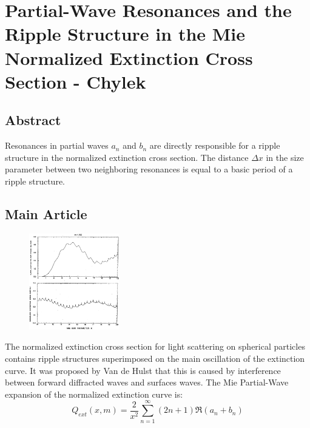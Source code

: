 \documentclass{article}
\theoremstyle{mystyle}
\begin{document}
\section{Partial-Wave Resonances and the Ripple Structure in the Mie Normalized Extinction Cross Section - Chylek}
\subsection{Abstract}
\noindent Resonances in partial waves $a_{n}$ and $b_{n}$ are directly responsible for a ripple structure in the normalized extinction cross section. The distance $\Delta x$ in the size parameter between two neighboring resonances is equal to a basic period of a ripple structure. 
\subsection{Main Article}
\begin{figure}
	\centering
	\includegraphics[width = 0.35\textwidth]{CHYLEK_1}
\end{figure}
\noindent The normalized extinction cross section for light scattering on spherical particles contains ripple structures superimposed on the main oscillation of the extinction curve. It was proposed by Van de Hulst that this is caused by interference between forward diffracted waves and surfaces waves. The Mie Partial-Wave expansion of the normalized extinction curve is:
\begin{equation}
Q_{ext}(x,m) = \frac{2}{x^2}\sum_{n=1}^{\infty} (2n+1)\Re(a_n+b_n)
\end{equation}
\end{document}

